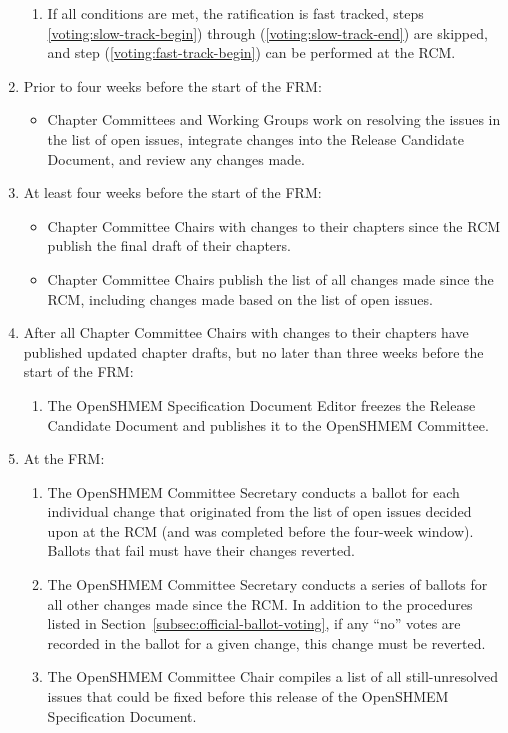 \begin{enumerate}
\begin{enumerate}
    \item If all conditions are met, the ratification is fast tracked,
      steps \ref{voting:slow-track-begin}) through
        (\ref{voting:slow-track-end}) are skipped, and step
        (\ref{voting:fast-track-begin}) can be performed at the RCM.
  \end{enumerate}

\item\label{voting:slow-track-begin} Prior to four weeks before the
  start of the FRM:
  \label{subsec:official-ballot-voting:t-4weeks-frm}
  \begin{itemize}
  \item Chapter Committees and Working Groups work on resolving the
    issues in the list of open issues, integrate changes
    into the Release Candidate Document, and review any
    changes made.
  \end{itemize}

\item At least four weeks before the start of the FRM:
  \begin{itemize}
  \item Chapter Committee Chairs with changes to their chapters since
    the RCM publish the final draft of their chapters.
  \item Chapter Committee Chairs publish the list of all
    changes made since the RCM, including changes made based on the
    list of open issues.
  \end{itemize}

\item After all Chapter Committee Chairs with changes to their
  chapters have published updated chapter drafts, but no later than
  three weeks before the start of the FRM:
  \begin{enumerate}
  \item The OpenSHMEM Specification Document Editor freezes the Release Candidate
    Document and publishes it to the OpenSHMEM Committee.
  \end{enumerate}

\item At the FRM:
  \begin{enumerate}
  \item The OpenSHMEM Committee Secretary conducts a ballot for each individual
    change that originated from the list of open issues decided upon
    at the RCM (and was completed before the four-week window).
    Ballots that fail must have their changes reverted.
  \item\label{voting:slow-track-end} The OpenSHMEM Committee Secretary conducts
    a series of ballots for all other changes made since the RCM.  In
    addition to the procedures listed in
    Section~\ref{subsec:official-ballot-voting}, if any ``no'' votes
    are recorded in the ballot for a given change, this change must be
    reverted.
  \item\label{voting:fast-track-begin} The OpenSHMEM Committee Chair compiles a
    list of all still-unresolved issues that could be fixed before
    this release of the OpenSHMEM Specification Document.


\end{enumerate}
\end{enumerate}
